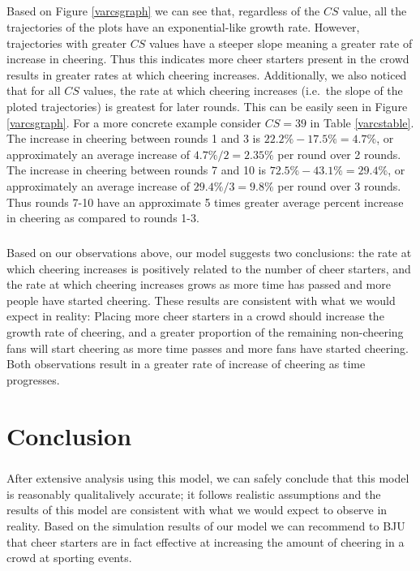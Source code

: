 \documentclass[oneside,12pt]{report}
\def\prefacesection#1{
\chapter*{#1}
\addcontentsline{toc}{chapter}{#1}
}
\begin{document}
\paragraph{}
Based on Figure \ref{varcsgraph} we can see that, regardless of the $CS$ value, all the trajectories of the plots have an exponential-like growth rate. However, trajectories with greater $CS$ values have a steeper slope meaning a greater rate of increase in cheering. Thus this indicates more cheer starters present in the crowd results in greater rates at which cheering increases. Additionally, we also noticed that for all $CS$ values, the rate at which cheering increases (i.e.~the slope of the ploted trajectories) is greatest for later rounds. This can be easily seen in Figure \ref{varcsgraph}. For a more concrete example consider $CS=39$ in Table \ref{varcstable}. The increase in cheering between rounds 1 and 3 is $22.2\%-17.5\%=4.7\%$, or approximately an average increase of $4.7\%/2=2.35\%$ per round over 2 rounds. The increase in cheering between rounds 7 and 10 is $72.5\%-43.1\%=29.4\%$, or approximately an average increase of $29.4\%/3=9.8\%$ per round over 3 rounds. Thus rounds 7-10 have an approximate 5 times greater average percent increase in cheering as compared to rounds 1-3. 
\paragraph{}
Based on our observations above, our model suggests two conclusions: the rate at which cheering increases is positively related to the number of cheer starters, and the rate at which cheering increases grows as more time has passed and more people have started cheering. These results are consistent with what we would expect in reality: Placing more cheer starters in a crowd should increase the growth rate of cheering, and a greater proportion of the remaining non-cheering fans will start cheering as more time passes and more fans have started cheering. Both observations result in a greater rate of increase of cheering as time progresses.

\prefacesection{Conclusion}
\paragraph{}
After extensive analysis using this model, we can safely conclude that this model is reasonably qualitalively accurate; it follows realistic assumptions and the results of this model are consistent with what we would expect to observe in reality. Based on the simulation results of our model we can recommend to BJU that cheer starters are in fact effective at increasing the amount of cheering in a crowd at sporting events. 
\end{document}
